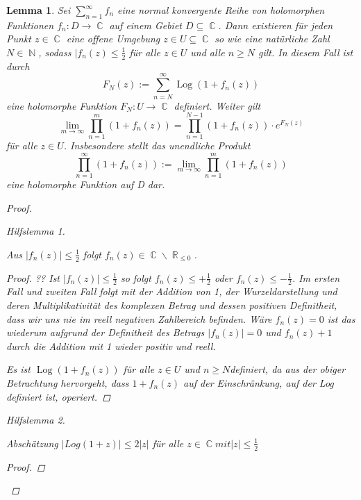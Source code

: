 \documentclass[10pt,a4paper]{article}
\theoremstyle{plain}
\newtheorem{lem}[thm]{Lemma}
\theoremstyle{definition}
\theoremstyle{remark}
\newtheorem{hilfslem}{Hilfslemma}
\DeclareMathOperator{\R}{\mathbb{R}}
\DeclareMathOperator{\C}{\mathbb{C}}
\DeclareMathOperator{\N}{\mathbb{N}}
\DeclareMathOperator{\Log}{Log}
\begin{document}
\begin{lem}

Sei $\sum_{n =1}^\infty f_{\textit{n}}$ eine normal konvergente Reihe von holomorphen Funktionen $f_{\textit{n}}: \textit{D}\rightarrow\C $ auf einem Gebiet
$D\subseteq\C$. Dann existieren für jeden Punkt $ z \in \C$ eine offene Umgebung $z \in U \subseteq \C$ so wie eine natürliche Zahl $N \in \N$, sodass $|f_{\textit{n}}(z) \leq \frac{1}{2}$ für alle $z \in U $ und alle $n \geq N $ gilt. In diesem Fall ist durch $$F_{N}(z) := \sum_{n = N}^\infty \Log( 1 + f_{n}(z))$$ eine holomorphe Funktion $F_{N} : U \rightarrow \C$ definiert. Weiter gilt $$\lim_{m\rightarrow\infty}\prod_{n=1}^m ( 1 + f_{n}(z)) = \prod_{n=1}^{N-1} ( 1 + f_{n}(z))\cdot e^{F_{N}(z)}$$ für alle $z \in U$. Insbesondere stellt das unendliche Produkt$$\prod_{n=1}^\infty ( 1 + f_{n}(z)) := \lim_{m\rightarrow\infty}\prod_{n=1}^m ( 1 + f_{n}(z))$$ eine holomorphe Funktion auf D dar.

\begin{proof}

\begin{hilfslem}\label{hilfslemma1}

Aus $|f_n(z)|\leq \frac{1}{2}$ folgt $f_n(z) \in \C\backslash\R_{\leq 0}$. 

\begin{proof}
??
Ist $|f_n(z)|\leq \frac{1}{2}$ so folgt $f_n(z)\leq +\frac{1}{2}$ oder $f_n(z)\leq -\frac{1}{2}$. Im ersten Fall und zweiten Fall folgt mit der Addition von 1, der Wurzeldarstellung und deren Multiplikativität des komplexen Betrag und dessen positiven Definitheit, dass wir uns nie im reell negativen Zahlbereich befinden. Wäre $f_n(z)=0$ ist das wiederum aufgrund der Definitheit des Betrags $|f_n(z)|=0$ und $f_n(z)+1$ durch die Addition mit 1 wieder positiv und reell.

Es ist $\Log( 1 + f_{n}(z))$ für alle $z \in U $ und $n \geq N$definiert, da aus der obiger Betrachtung hervorgeht, dass $1+f_n(z)$ auf der Einschränkung, auf der Log definiert ist, operiert.

\end{proof}

\end{hilfslem}

\begin{hilfslem}\label{hilfslemma2}

Abschätzung $ |Log(1+z)|\leq 2|z|$ für alle $z \in \C mit |z| \leq \frac{1}{2}$

\begin{proof}


\end{proof}
\end{hilfslem}
\end{proof}
\end{lem}
\end{document}
